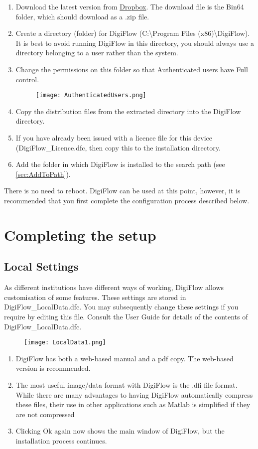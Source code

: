 \documentclass{article}
\newcommand{\Files}[1]{\textcolor{myblue}{#1}}
\begin{document}
\begin{enumerate}
    \item Download the latest version from \href{https://www.dropbox.com/sh/uc5nmllmd11pdj1/AADNkwK5MmsYD2JW1gcFcXbTa?dl=0}{Dropbox}. The download file is the Bin64 folder, which should download as a .zip file. 
    \item Create a directory (folder) for DigiFlow (\Files{C:\textbackslash Program Files (x86)\textbackslash DigiFlow}). It is best to avoid running DigiFlow in this directory, you should always use a directory belonging to a user rather than the system. 
    \item Change the permissions on this folder so that \Files{Authenticated users} have \Files{Full control}. 
    \begin{figure}[h]
        \centering
        \texttt{[image: AuthenticatedUsers.png]}
    \end{figure}
    \item Copy the distribution files from the extracted directory into the DigiFlow directory.
    \item If you have already been issued with a licence file for this device (\Files{DigiFlow\_Licence.dfc}, then copy this to the installation directory. 
    \item Add the folder in which DigiFlow is installed to the search path (see \ref{sec:AddToPath}). 
\end{enumerate}
There is no need to reboot. DigiFlow can be used at this point, however, it is recommended that you first complete the configuration process described below. 

\section{Completing the setup}
\subsection{Local Settings}
As different institutions have different ways of working, DigiFlow allows customisation of some features. These settings are stored in \Files{DigiFlow\_LocalData.dfc}. You may subsequently change these settings if you require by editing this file. Consult the User Guide for details of the contents of \Files{DigiFlow\_LocalData.dfc}. 
\begin{figure}
    \texttt{[image: LocalData1.png]}
\end{figure}
\begin{enumerate}
    \item DigiFlow has both a web-based manual and a pdf copy. The web-based version is recommended. 
    \item The most useful image/data format with DigiFlow is the \Files{.dfi} file format. While there are many advantages to having DigiFlow automatically compress these files, their use in other applications such as Matlab is simplified if they are not compressed
    \item Clicking Ok again now shows the main window of DigiFlow, but the installation process continues. 
\end{enumerate}
\end{document}
